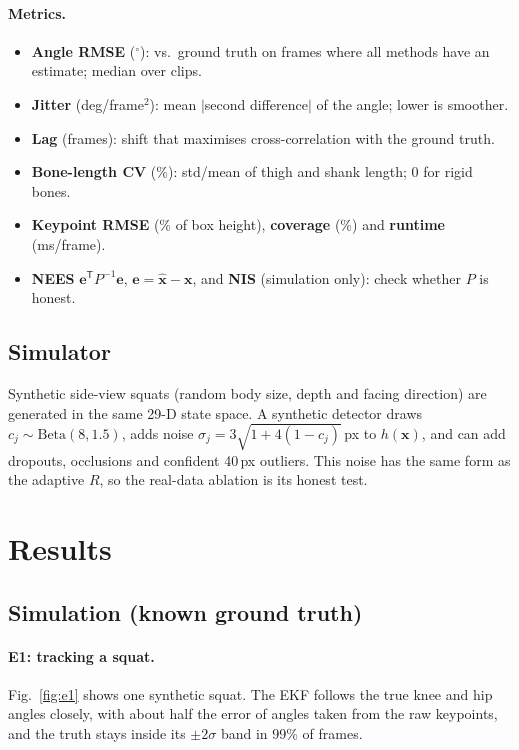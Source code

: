 \documentclass[12pt,a4paper]{article}
\newcommand{\T}{^{\mathsf{T}}}
\begin{document}
\paragraph{Metrics.}
\begin{itemize}[itemsep=1pt]
    \item \textbf{Angle RMSE} ($^\circ$): vs.\ ground truth on frames where all methods have an estimate;
          median over clips.
    \item \textbf{Jitter} (deg/frame$^2$): mean $|$second difference$|$ of the angle; lower is smoother.
    \item \textbf{Lag} (frames): shift that maximises cross-correlation with the ground truth.
    \item \textbf{Bone-length CV} (\%): std/mean of thigh and shank length; 0 for rigid bones.
    \item \textbf{Keypoint RMSE} (\% of box height), \textbf{coverage} (\%) and \textbf{runtime} (ms/frame).
    \item \textbf{NEES} $\mathbf{e}\T P^{-1}\mathbf{e}$, $\mathbf{e}=\hat{\mathbf{x}}-\mathbf{x}$, and
          \textbf{NIS} (simulation only): check whether $P$ is honest.
\end{itemize}

\subsection{Simulator}

Synthetic side-view squats (random body size, depth and facing direction) are generated in the same 29-D state
space. A synthetic detector draws $c_j\sim\text{Beta}(8,1.5)$, adds noise $\sigma_j=3\sqrt{1+4(1-c_j)}$\,px
to $h(\mathbf{x})$, and can add dropouts, occlusions and confident 40\,px outliers. This noise has the same
form as the adaptive $R$, so the real-data ablation is its honest test.

\clearpage
\section{Results}
\label{sec:results}

\subsection{Simulation (known ground truth)}

\paragraph{E1: tracking a squat.} Fig.~\ref{fig:e1} shows one synthetic squat. The EKF follows the true
knee and hip angles closely, with about half the error of angles taken from the raw keypoints, and the truth
stays inside its $\pm2\sigma$ band in 99\% of frames.
\end{document}
